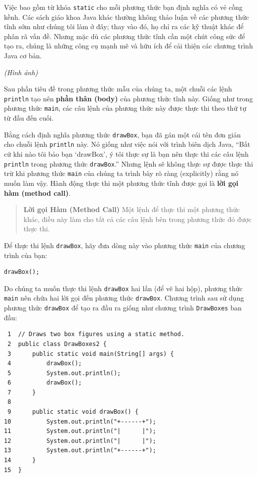 Việc bao gồm từ khóa \texttt{static} cho mỗi phương thức bạn định nghĩa
có vẻ cồng kềnh. Các sách giáo khoa Java khác thường không thảo luận về
các phương thức tĩnh sớm như chúng tôi làm ở đây; thay vào đó, họ chỉ ra
các kỹ thuật khác để phân rã vấn đề. Nhưng mặc dù các phương thức tĩnh
cần một chút công sức để tạo ra, chúng là những công cụ mạnh mẽ và hữu
ích để cải thiện các chương trình Java cơ bản.

\emph{(Hình ảnh)}

Sau phần tiêu đề trong phương thức mẫu của chúng ta, một chuỗi các lệnh
\texttt{println} tạo nên \textbf{phần thân (body)} của phương thức tĩnh
này. Giống như trong phương thức \texttt{main}, các câu lệnh của phương
thức này được thực thi theo thứ tự từ đầu đến cuối.

Bằng cách định nghĩa phương thức \texttt{drawBox}, bạn đã gán một cái
tên đơn giản cho chuỗi lệnh \texttt{println} này. Nó giống như việc nói
với trình biên dịch Java, ``Bất cứ khi nào tôi bảo bạn `drawBox', ý tôi
thực sự là bạn nên thực thi các câu lệnh \texttt{println} trong phương
thức \texttt{drawBox}.'' Nhưng lệnh sẽ không thực sự được thực thi trừ
khi phương thức \texttt{main} của chúng ta trình bày rõ ràng
(explicitly) rằng nó muốn làm vậy. Hành động thực thi một phương thức
tĩnh được gọi là \textbf{lời gọi hàm (method call)}.

\begin{quote}
\textbf{Lời gọi Hàm (Method Call)} Một lệnh để thực thi một phương thức
khác, điều này làm cho tất cả các câu lệnh bên trong phương thức đó được
thực thi.
\end{quote}

Để thực thi lệnh \texttt{drawBox}, hãy đưa dòng này vào phương thức
\texttt{main} của chương trình của bạn:

\begin{verbatim}
drawBox();
\end{verbatim}

Do chúng ta muốn thực thi lệnh \texttt{drawBox} hai lần (để vẽ hai hộp),
phương thức \texttt{main} nên chứa hai lời gọi đến phương thức
\texttt{drawBox}. Chương trình sau sử dụng phương thức \texttt{drawBox}
để tạo ra đầu ra giống như chương trình \texttt{DrawBoxes} ban đầu:

\begin{verbatim}
 1  // Draws two box figures using a static method.
 2  public class DrawBoxes2 {
 3      public static void main(String[] args) {
 4          drawBox();
 5          System.out.println();
 6          drawBox();
 7      }
 8
 9      public static void drawBox() {
10          System.out.println("+------+");
11          System.out.println("|      |");
12          System.out.println("|      |");
13          System.out.println("+------+");
14      }
15  }
\end{verbatim}

